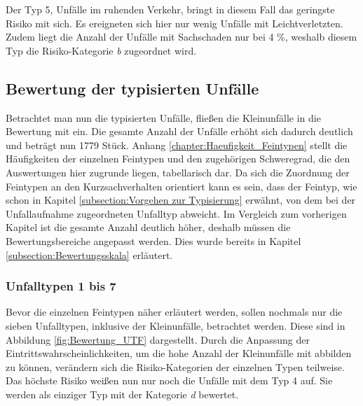 Der Typ 5, Unfälle im ruhenden Verkehr, bringt in diesem Fall das geringste Risiko mit sich. Es ereigneten sich hier nur wenig Unfälle mit Leichtverletzten. Zudem liegt die Anzahl der Unfälle mit Sachschaden nur bei 4 \%, weshalb diesem Typ die Risiko-Kategorie \textit{b} zugeordnet wird.

\subsection{Bewertung der typisierten Unfälle}\label{subsection:Bewertung der typisierten Unfälle}
Betrachtet man nun die typisierten Unfälle, fließen die Kleinunfälle in die Bewertung mit ein. Die gesamte Anzahl der Unfälle erhöht sich dadurch deutlich und beträgt nun 1779 Stück. Anhang \ref{chapter:Haeufigkeit_Feintypen} stellt die Häufigkeiten der einzelnen Feintypen und den zugehörigen Schweregrad, die den Auswertungen hier zugrunde liegen, tabellarisch dar. Da sich die Zuordnung der Feintypen an den Kurzsachverhalten orientiert kann es sein, dass der Feintyp, wie schon in Kapitel \ref{subsection:Vorgehen zur Typisierung} erwähnt, von dem bei der Unfallaufnahme zugeordneten Unfalltyp abweicht. Im Vergleich zum vorherigen Kapitel ist die gesamte Anzahl deutlich höher, deshalb müssen die Bewertungsbereiche angepasst werden. Dies wurde bereits in Kapitel \ref{subsection:Bewertungsskala} erläutert.

\subsubsection{Unfalltypen 1 bis 7}
Bevor die einzelnen Feintypen näher erläutert werden, sollen nochmals nur die sieben Unfalltypen, inklusive der Kleinunfälle, betrachtet werden. Diese sind in Abbildung \ref{fig:Bewertung_UTF} dargestellt. Durch die Anpassung der Eintrittswahrscheinlichkeiten, um die hohe Anzahl der Kleinunfälle mit abbilden zu können, verändern sich die Risiko-Kategorien der einzelnen Typen teilweise. Das höchste Risiko weißen nun nur noch die Unfälle mit dem Typ 4 auf. Sie werden als einziger Typ mit der Kategorie \textit{d} bewertet.

